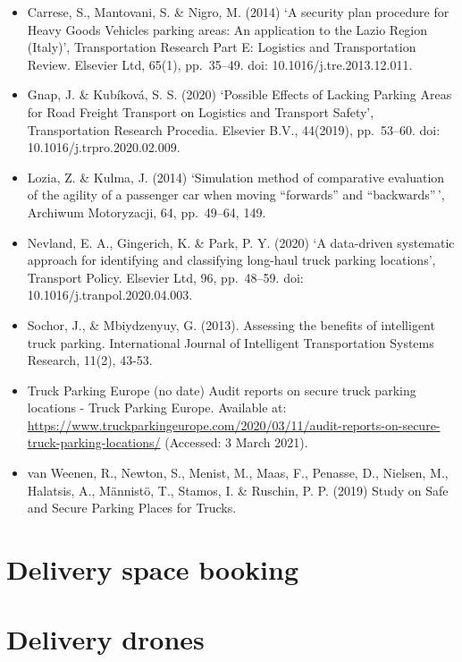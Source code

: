 \documentclass[
]{book}
\providecommand{\tightlist}{%
  \setlength{\itemsep}{0pt}\setlength{\parskip}{0pt}}
\begin{document}
\begin{itemize}
\tightlist
\item
  Carrese, S., Mantovani, S. \& Nigro, M. (2014) `A security plan procedure for Heavy Goods Vehicles parking areas: An application to the Lazio Region (Italy)', Transportation Research Part E: Logistics and Transportation Review. Elsevier Ltd, 65(1), pp.~35--49. doi: 10.1016/j.tre.2013.12.011.
\item
  Gnap, J. \& Kubíková, S. S. (2020) `Possible Effects of Lacking Parking Areas for Road Freight Transport on Logistics and Transport Safety', Transportation Research Procedia. Elsevier B.V., 44(2019), pp.~53--60. doi: 10.1016/j.trpro.2020.02.009.
\item
  Lozia, Z. \& Kulma, J. (2014) `Simulation method of comparative evaluation of the agility of a passenger car when moving ``forwards'' and ``backwards''\,', Archiwum Motoryzacji, 64, pp.~49--64, 149.
\item
  Nevland, E. A., Gingerich, K. \& Park, P. Y. (2020) `A data-driven systematic approach for identifying and classifying long-haul truck parking locations', Transport Policy. Elsevier Ltd, 96, pp.~48--59. doi: 10.1016/j.tranpol.2020.04.003.
\item
  Sochor, J., \& Mbiydzenyuy, G. (2013). Assessing the benefits of intelligent truck parking. International Journal of Intelligent Transportation Systems Research, 11(2), 43-53.
\item
  Truck Parking Europe (no date) Audit reports on secure truck parking locations - Truck Parking Europe. Available at: \url{https://www.truckparkingeurope.com/2020/03/11/audit-reports-on-secure-truck-parking-locations/} (Accessed: 3 March 2021).
\item
  van Weenen, R., Newton, S., Menist, M., Maas, F., Penasse, D., Nielsen, M., Halatsis, A., Männistö, T., Stamos, I. \& Ruschin, P. P. (2019) Study on Safe and Secure Parking Places for Trucks.
\end{itemize}

\hypertarget{space_book}{%
\section{Delivery space booking}\label{space_book}}

\hypertarget{delivery_drone}{%
\section{Delivery drones}\label{delivery_drone}}
\end{document}
